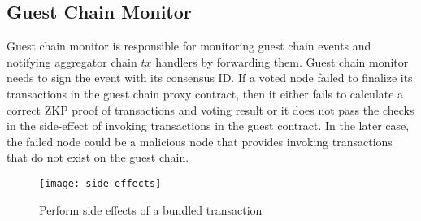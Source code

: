 \subsection{Guest Chain Monitor}
Guest chain monitor is responsible for monitoring guest chain events and notifying aggregator chain $tx$ handlers by forwarding them. Guest chain monitor needs to sign the event with its consensus ID. If a voted \dprotocol node failed to finalize its transactions in the guest chain proxy contract, then it either fails to calculate a correct ZKP proof of transactions and voting result or it does not pass the checks in the side-effect of invoking transactions in the guest contract. In the later case, the failed node could be a malicious node that provides invoking transactions that do not exist on the guest chain.  
\begin{figure}[!ht]
\texttt{[image: side-effects]}
\caption{Perform side effects of a bundled transaction}
\label{sideffects}
\end{figure}


